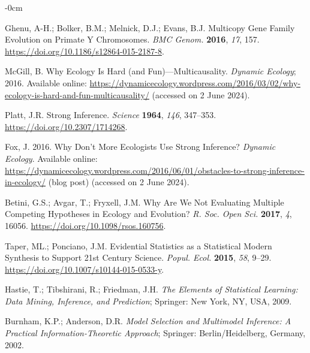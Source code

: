 \documentclass[entropy,article,accept,pdftex,moreauthors]{Definitions/mdpi}
\begin{document}
\begin{adjustwidth}{-\extralength}{0cm}
\begin{thebibliography}{999}
Ghenu, A-H.; Bolker, B.M.; Melnick, D.J.; Evans, B.J.  Multicopy Gene Family Evolution on Primate {Y}
Chromosomes.  \emph{BMC Genom.} \textbf{2016}, \emph{17}, 157.
\url{https://doi.org/10.1186/s12864-015-2187-8}.

  McGill, B. Why Ecology Is Hard (and Fun)---Multicausality.  \emph{Dynamic Ecology}; 2016. %
Available online: \url{https://dynamicecology.wordpress.com/2016/03/02/why-ecology-is-hard-and-fun-multicausality/} (accessed on 2 June 2024). %

Platt, J.R. Strong {Inference}.  \emph{Science} \textbf{1964}, \emph{146},  347--353. %
\url{https://doi.org/10.2307/1714268}.

Fox, J. 2016. Why Don't More Ecologists Use Strong Inference?
\emph{Dynamic  Ecology}.  Available online: 
\url{https://dynamicecology.wordpress.com/2016/06/01/obstacles-to-strong-inference-in-ecology/} (blog post) (accessed on 2 June 2024). %

Betini, G.S.;  Avgar, T.; Fryxell, J.M.  Why Are We
Not Evaluating Multiple Competing Hypotheses in Ecology and
Evolution? \emph{R. Soc. Open Sci.} \textbf{2017}, \emph{4},  16056.
\url{https://doi.org/10.1098/rsos.160756}.

Taper, ML.; Ponciano, J.M. Evidential Statistics
as a Statistical Modern Synthesis to Support 21st Century Science. 
\emph{Popul. Ecol.} \textbf{2015}, \emph{58},  9--29.
\url{https://doi.org/10.1007/s10144-015-0533-y}.

Hastie, T.; Tibshirani, R.;  Friedman, J.H. \emph{The
Elements of Statistical Learning: Data Mining, Inference, and
Prediction};  Springer: New York, NY, USA, 2009.

  Burnham, K.P.; Anderson, D.R.
  \emph{{Model} %
 {Selection} and {Multimodel} {Inference}:
{A} {Practical} {Information}-Theoretic {Approach}}; Springer:  Berlin/Heidelberg, Germany, %
2002.


\end{thebibliography}
\end{adjustwidth}
\end{document}
